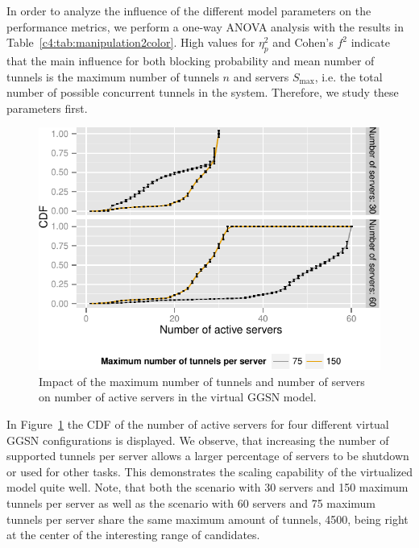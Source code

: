 In order to analyze the influence of the different model parameters on the performance metrics, we perform a one-way ANOVA analysis with the results in Table~\ref{c4:tab:manipulation2color}. High values for $\eta_p^2$ and Cohen's $f^2$ \cite{stats} indicate that the main influence for both blocking probability and mean number of tunnels is the maximum number of tunnels $n$ and servers $S_{\max}$, i.e. the total number of possible concurrent tunnels in the system.
Therefore, we study these parameters first.

\begin{figure}[htb]
  \centering
  \includegraphics{images/instanceuse-multiserver-real.pdf}
  \caption{Impact of the maximum number of tunnels and number of servers on number of active servers in the virtual \gls{GGSN} model.}
 \label{c4:fig:instance_use_virtual}
\end{figure}

In Figure~\ref{c4:fig:instance_use_virtual} the \gls{CDF} of the number of active servers for four different virtual \gls{GGSN} configurations is displayed. We observe, that increasing the number of supported tunnels per server allows a larger percentage of servers to be shutdown or used for other tasks. This demonstrates the scaling capability of the virtualized model quite well. Note, that both the scenario with 30 servers and 150 maximum tunnels per server as well as the scenario with 60 servers and 75 maximum tunnels per server share the same maximum amount of tunnels, 4500, being right at the center of the interesting range of candidates.


